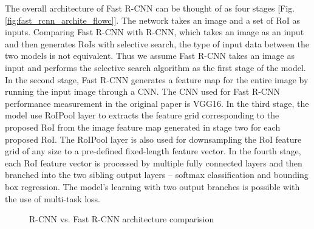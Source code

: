 The overall architecture of Fast R-CNN can be thought of as four stages [Fig. \ref{fig:fast_rcnn_archite_flowc}]. The network takes an image and a set of RoI as inputs. Comparing Fast R-CNN with R-CNN, which takes an image as an input and then generates RoIs with selective search, the type of input data between the two models is not equivalent. Thus we assume Fast R-CNN takes an image as input and performs the selective search algorithm as the first stage of the model. In the second stage, Fast R-CNN generates a feature map for the entire image by running the input image through a CNN. The CNN used for Fast R-CNN performance measurement in the original paper is VGG16. In the third stage, the model use RoIPool layer to extracts the feature grid corresponding to the proposed RoI from the image feature map generated in stage two for each proposed RoI. The RoIPool layer is also used for downsampling the RoI feature grid of any size to a pre-defined fixed-length feature vector. In the fourth stage, each RoI feature vector is processed by multiple fully connected layers and then branched into the two sibling output layers -- softmax classification and bounding box regression. The model's learning with two output branches is possible with the use of multi-task loss.

\begin{figure}[!ht]
    \centering
    \caption{R-CNN vs. Fast R-CNN architecture comparision} \label{fig:rcnn_vs_fast}
\end{figure}


